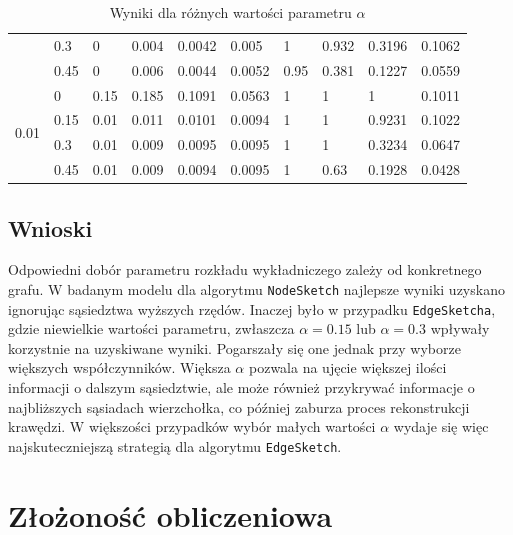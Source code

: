 \begin{table}[!ht]
\begin{tabular}{|l|l|l|l|l|l|l|l|l|l|}
            & 0.3 & 0 & 0.004 & 0.0042 & 0.005 & 1 & 0.932 & 0.3196 & 0.1062 \\ \cline{2-10}
            & 0.45 & 0 & 0.006 & 0.0044 & 0.0052 & 0.95 & 0.381 & 0.1227 & 0.0559 \\ \hline\hline
        \multirow{4}{*}{0.01}    & 0 & 0.15 & 0.185 & 0.1091 & 0.0563 & 1 & 1 & 1 & 0.1011 \\ \cline{2-10}
            & 0.15 & 0.01 & 0.011 & 0.0101 & 0.0094 & 1 & 1 & 0.9231 & 0.1022 \\ \cline{2-10}
            & 0.3 & 0.01 & 0.009 & 0.0095 & 0.0095 & 1 & 1 & 0.3234 & 0.0647 \\ \cline{2-10}
            & 0.45 & 0.01 & 0.009 & 0.0094 & 0.0095 & 1 & 0.63 & 0.1928 & 0.0428 \\ \hline
        \end{tabular}
        \caption{Wyniki dla różnych wartości parametru $\alpha$}
        \label{tab:alpha}
    \end{table}

    \subsection{Wnioski}
    Odpowiedni dobór parametru rozkładu wykładniczego zależy od konkretnego grafu. W badanym modelu dla algorytmu \texttt{NodeSketch} najlepsze wyniki uzyskano ignorując sąsiedztwa wyższych rzędów. Inaczej było w przypadku \texttt{EdgeSketcha}, gdzie niewielkie wartości parametru, zwłaszcza $\alpha = 0.15$ lub $\alpha = 0.3$ wpływały korzystnie na uzyskiwane wyniki. Pogarszały się one jednak przy wyborze większych współczynników. Większa $\alpha$ pozwala na ujęcie większej ilości informacji o dalszym sąsiedztwie, ale może również przykrywać informacje o najbliższych sąsiadach wierzchołka, co później zaburza proces rekonstrukcji krawędzi. W większości przypadków wybór małych wartości $\alpha$ wydaje się więc najskuteczniejszą strategią dla algorytmu \texttt{EdgeSketch}. 

\section{Złożoność obliczeniowa}
\label{sec:performance}

